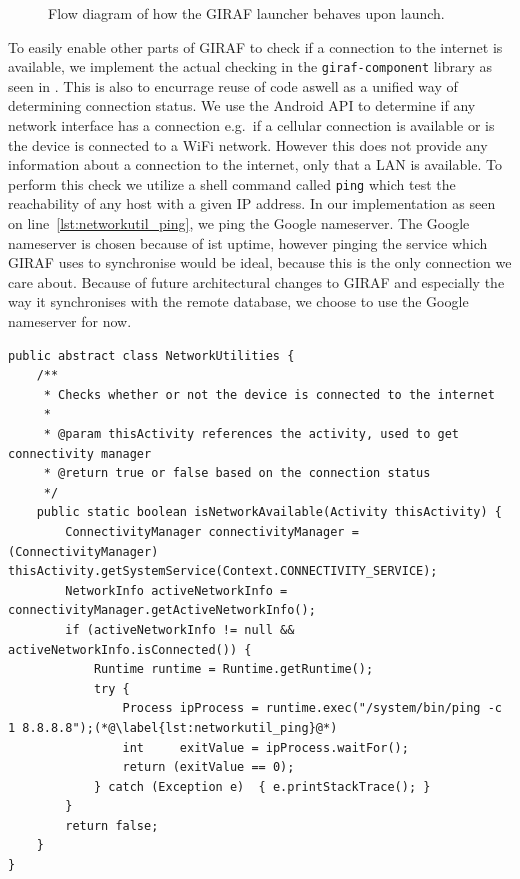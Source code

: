 \begin{figure}[h]
    \centering
    
    \caption{Flow diagram of how the GIRAF launcher behaves upon launch.}\label{fig:launcher_offline_flow}
\end{figure}

To easily enable other parts of GIRAF to check if a connection to the internet is available, we implement the actual checking in the \texttt{giraf-component} library as seen in .
This is also to encurrage reuse of code aswell as a unified way of determining connection status.
We use the Android API to determine if any network interface has a connection e.g.\ if a cellular connection is available or is the device is connected to a WiFi network.
However this does not provide any information about a connection to the internet, only that a LAN is available.
To perform this check we utilize a shell command called \texttt{ping} which test the reachability of any host with a given IP address.
In our implementation as seen on line~\ref{lst:networkutil_ping}, we ping the Google nameserver.
The Google nameserver is chosen because of ist uptime, however pinging the service which GIRAF uses to synchronise would be ideal, because this is the only connection we care about.
Because of future architectural changes to GIRAF and especially the way it synchronises with the remote database, we choose to use the Google nameserver for now.

\begin{lstlisting}[float, caption={The class from the \texttt{giraf-component} library where network utilities are implemented, such as the method used to check if a connection to the internet is available}, label={lst:networkutil}]
public abstract class NetworkUtilities {
    /**
     * Checks whether or not the device is connected to the internet
     *
     * @param thisActivity references the activity, used to get connectivity manager
     * @return true or false based on the connection status
     */
    public static boolean isNetworkAvailable(Activity thisActivity) {
        ConnectivityManager connectivityManager = (ConnectivityManager) thisActivity.getSystemService(Context.CONNECTIVITY_SERVICE);
        NetworkInfo activeNetworkInfo = connectivityManager.getActiveNetworkInfo();
        if (activeNetworkInfo != null && activeNetworkInfo.isConnected()) {
            Runtime runtime = Runtime.getRuntime();
            try {
                Process ipProcess = runtime.exec("/system/bin/ping -c 1 8.8.8.8");(*@\label{lst:networkutil_ping}@*)
                int     exitValue = ipProcess.waitFor();
                return (exitValue == 0);
            } catch (Exception e)  { e.printStackTrace(); }
        }
        return false;
    }
}
\end{lstlisting}

